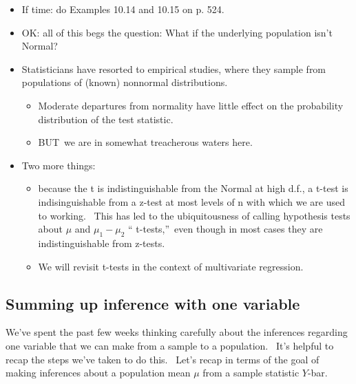 \documentclass[11pt]{article}
\begin{document}
\begin{itemize}
\item If time: do Examples 10.14 and 10.15 on p. 524.

\item OK: all of this begs the question: What if the underlying population
isn't Normal?

\item Statisticians have resorted to empirical studies, where they sample
from populations of (known) nonnormal distributions. \ 

\begin{itemize}
\item Moderate departures from normality have little effect on the
probability distribution of the test statistic.

\item BUT\ we are in somewhat treacherous waters here.
\end{itemize}

\item Two more things:

\begin{itemize}
\item because the t is indistinguishable from the Normal at high d.f., a
t-test is indisinguishable from a z-test at most levels of n with which we
are used to working. \ This has led to the ubiquitousness of calling
hypothesis tests about $\mu $ and $\mu _{1}-\mu _{2}$ \textquotedblleft
t-tests,\textquotedblright\ even though in most cases they are
indistinguishable from z-tests.

\item We will revisit t-tests in the context of multivariate regression.
\end{itemize}
\end{itemize}

\subsection{Summing up inference with one variable}

We've spent the past few weeks thinking carefully about the inferences
regarding one variable that we can make from a sample to a population. \
It's helpful to recap the steps we've taken to do this. \ Let's recap in
terms of the goal of making inferences about a population mean $\mu $ from a
sample statistic $Y$-bar.
\end{document}
